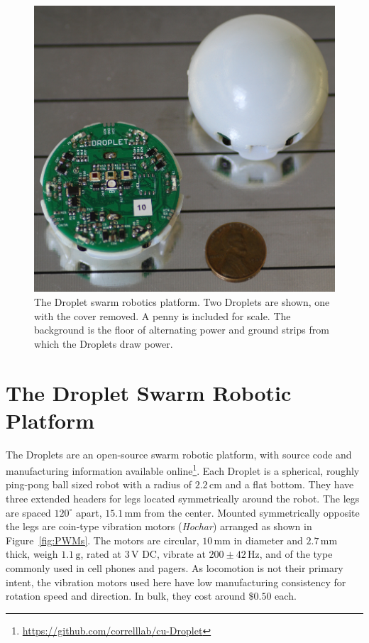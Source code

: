\documentclass[letterpaper, 10pt, conference]{ieeeconf}
\begin{document}
\begin{figure}[!htb]
	\centering
		\includegraphics[width=0.8\columnwidth]{./Images/Droplets.png}
	\caption{The Droplet swarm robotics platform. Two Droplets are shown, one with the cover removed. A penny is included for scale. The background is the floor of alternating power and ground strips from which the Droplets draw power.}
	\label{Droplets}
\end{figure}


\section{The Droplet Swarm Robotic Platform}
The Droplets are an open-source swarm robotic platform, with source code and manufacturing information available online\footnote{\url{https://github.com/correlllab/cu-Droplet}}. Each Droplet is a spherical, roughly ping-pong ball sized robot with a radius of $2.2\,\mathrm{cm}$ and a flat bottom. They have three extended headers for legs located symmetrically around the robot. The legs are spaced $120^\circ$ apart, $15.1\, \mathrm{mm}$ from the center. Mounted symmetrically opposite the legs are coin-type vibration motors (\emph{Hochar}) arranged as shown in Figure~\ref{fig:PWMs}. The  motors  are circular, $10\,\mathrm{mm}$ in diameter and $2.7\,\mathrm{mm}$ thick, weigh $1.1\,\mathrm{g}$, rated at $3\,\mathrm{V}$ DC, vibrate at $200\pm42\,\mathrm{Hz}$, and of the type commonly used in cell phones and pagers. As locomotion is not their primary intent, the vibration motors used here have low manufacturing consistency for rotation speed and direction. In bulk, they cost around $\$0.50$ each.
\end{document}

